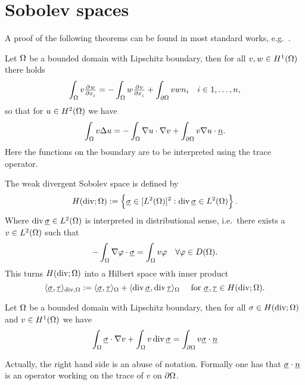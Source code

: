 \documentclass[thesis.tex]{subfiles}
\begin{document}
\section{Sobolev spaces}
A proof of the following theorems can be found in most standard works, e.g.~\cite{gaticasimple}.
\begin{thm}
  \label{thm:green}
  Let $\Omega$ be a bounded domain with Lipschitz boundary, then for all $v,w \in H^1(\Omega)$  there holds
  \[
    \int_{\O} v \pd{w}{x_i} = - \int_{\O} w \pd{v}{x_i} +   \int_{\partial \O} vw n_i \quad i \in {1,\dots, n},
  \]
  so that for  $u \in H^2(\Omega)$ we have
  \[
    \int_{\Omega} v\Delta u = - \int_{\Omega} \nabla u \cdot \nabla v + \int_{\partial \Omega} v \nabla u \cdot \underline{n}.
  \]
  Here the functions on the boundary are to be interpreted using the trace operator.
\end{thm}
\begin{defn}
  \label{def:hdiv}
The weak divergent Sobolev space is defined by
\[
  H(\operatorname{div}; \Omega) := \set{ \underline{\sigma} \in [L^2(\Omega)]^2 : \operatorname{div}\underline{\sigma} \in L^2(\Omega)}.
  \]
  Where $\operatorname{div} \underline{\sigma} \in L^2(\Omega)$ is interpreted in distributional sense, i.e.~there exists a $v\in L^2(\Omega)$ such that
  \[
    - \int_{\Omega} \nabla \varphi \cdot \underline{\sigma} = \int_{\Omega} v\varphi\quad \forall \varphi \in D(\Omega).
  \]
  This turns $H(\operatorname{div}; \Omega)$ into a Hilbert space with inner product
  \[
    \langle \underline{\sigma}, \underline{\tau} \rangle_{\operatorname{div},\Omega} :=  \langle \underline{\sigma}, \underline{\tau} \rangle_{\Omega} + \langle \operatorname{div} \underline{\sigma}, \operatorname{div} \underline{\tau} \rangle_{\Omega}\quad \text{ for } \underline{\sigma}, \underline{\tau} \in H(\operatorname{div}; \Omega).
  \]
\end{defn}
\begin{thm}
  \label{thm:divergence}
  Let $\Omega$ be a bounded domain with Lipschitz boundary, then for all $\sigma \in H(\operatorname{div}; \Omega)$ and $v \in H^1(\Omega)$ we  have
  \[
    \int_\Omega \underline{\sigma} \cdot \nabla v + \int_\Omega  v \operatorname{div} \underline{\sigma} = \int_{\partial \Omega} v \underline{\sigma}\cdot \underline{n}
  \]
\end{thm}
Actually, the right hand side is an abuse of notation. Formally one has that $\underline{\sigma}\cdot\underline{n}$ is an operator working on the
trace of $v$ on $\partial \Omega$. 
\end{document}
